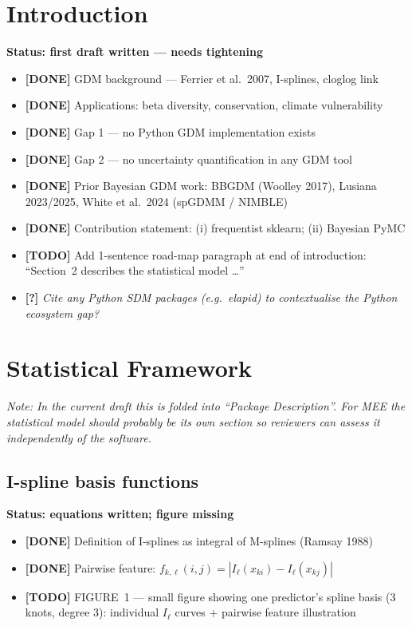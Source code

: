 \documentclass[11pt,a4paper]{article}
\newcommand{\done}[1]{{\color{donegreen}\textbf{[DONE]} #1}}
\newcommand{\todo}[1]{{\color{todored}\textbf{[TODO]} #1}}
\newcommand{\question}[1]{{\color{questionblue}\textbf{[?]} \textit{#1}}}
\newcommand{\note}[1]{{\color{notegray}\textit{Note: #1}}}
\newenvironment{scaffold}[1]{%
  \begin{mdframed}[backgroundcolor=gray!6, linecolor=gray!30,
                   leftmargin=0pt, rightmargin=0pt,
                   innerleftmargin=8pt, innerrightmargin=8pt,
                   innertopmargin=6pt, innerbottommargin=6pt]
  \noindent\textbf{#1}\par\vspace{2pt}
  \begin{itemize}[leftmargin=1.4em, topsep=2pt, itemsep=1pt, parsep=0pt]
}{%
  \end{itemize}
  \end{mdframed}
  \vspace{4pt}
}
\begin{document}
\section{Introduction}

\begin{scaffold}{Status: first draft written --- needs tightening}
  \item \done{GDM background --- Ferrier et al.\ 2007, I-splines, cloglog link}
  \item \done{Applications: beta diversity, conservation, climate vulnerability}
  \item \done{Gap 1 --- no Python GDM implementation exists}
  \item \done{Gap 2 --- no uncertainty quantification in any GDM tool}
  \item \done{Prior Bayesian GDM work: BBGDM (Woolley 2017), Lusiana 2023/2025,
    White et al.\ 2024 (spGDMM / NIMBLE)}
  \item \done{Contribution statement: (i) frequentist sklearn; (ii) Bayesian PyMC}
  \item \todo{Add 1-sentence road-map paragraph at end of introduction:
    ``Section~2 describes the statistical model \ldots''}
  \item \question{Cite any Python SDM packages (e.g.\ elapid) to contextualise
    the Python ecosystem gap?}
\end{scaffold}


\section{Statistical Framework}

\note{In the current draft this is folded into ``Package Description''. For MEE
the statistical model should probably be its own section so reviewers can assess
it independently of the software.}

\subsection{I-spline basis functions}

\begin{scaffold}{Status: equations written; figure missing}
  \item \done{Definition of I-splines as integral of M-splines (Ramsay 1988)}
  \item \done{Pairwise feature: $f_{k,\ell}(i,j) = |I_\ell(x_{ki}) -
    I_\ell(x_{kj})|$}
  \item \todo{FIGURE~1 --- small figure showing one predictor's spline basis
    (3 knots, degree 3): individual $I_\ell$ curves + pairwise feature illustration}
\end{scaffold}
\end{document}
